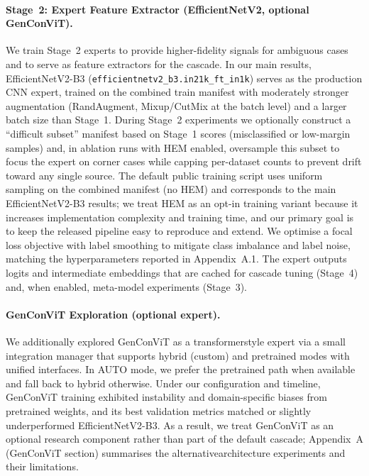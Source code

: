 \paragraph{Stage~2: Expert Feature Extractor (EfficientNetV2, optional GenConViT).} We train Stage~2 experts to provide higher\hyp fidelity signals for ambiguous cases and to serve as feature extractors for the cascade. In our main results, EfficientNetV2\hyp B3 (\verb|efficientnetv2_b3.in21k_ft_in1k|) serves as the production CNN expert, trained on the combined train manifest with moderately stronger augmentation (RandAugment, Mixup/CutMix at the batch level) and a larger batch size than Stage~1. During Stage~2 experiments we optionally construct a ``difficult subset'' manifest based on Stage~1 scores (misclassified or low\hyp margin samples) and, in ablation runs with HEM enabled, oversample this subset to focus the expert on corner cases while capping per\hyp dataset counts to prevent drift toward any single source. The default public training script uses uniform sampling on the combined manifest (no HEM) and corresponds to the main EfficientNetV2\hyp B3 results; we treat HEM as an opt\hyp in training variant because it increases implementation complexity and training time, and our primary goal is to keep the released pipeline easy to reproduce and extend. We optimise a focal loss objective with label smoothing to mitigate class imbalance and label noise, matching the hyperparameters reported in Appendix~A.1. The expert outputs logits and intermediate embeddings that are cached for cascade tuning (Stage~4) and, when enabled, meta\hyp model experiments (Stage~3).

\paragraph{GenConViT Exploration (optional expert).} We additionally explored GenConViT as a transformer\-style expert via a small integration manager that supports hybrid (custom) and pretrained modes with unified interfaces. In AUTO mode, we prefer the pretrained path when available and fall back to hybrid otherwise. Under our configuration and timeline, GenConViT training exhibited instability and domain\hyp specific biases from pretrained weights, and its best validation metrics matched or slightly underperformed EfficientNetV2\hyp B3. As a result, we treat GenConViT as an optional research component rather than part of the default cascade; Appendix~A (GenConViT section) summarises the alternative\-architecture experiments and their limitations.

